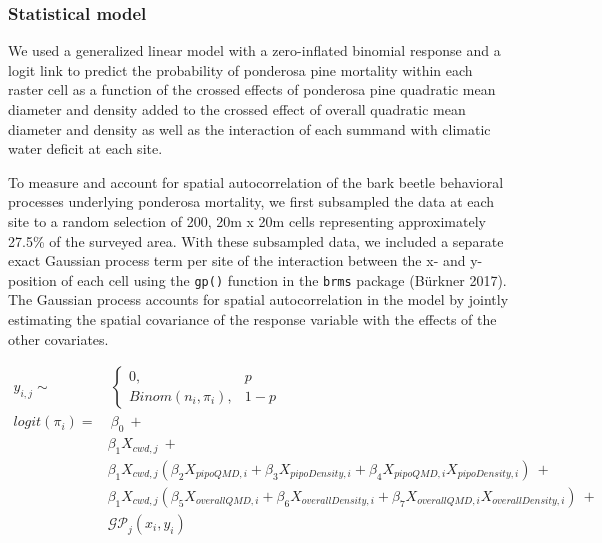 \documentclass[]{article}
\begin{document}
\subsubsection{Statistical model}\label{statistical-model}

We used a generalized linear model with a zero-inflated binomial
response and a logit link to predict the probability of ponderosa pine
mortality within each raster cell as a function of the crossed effects
of ponderosa pine quadratic mean diameter and density added to the
crossed effect of overall quadratic mean diameter and density as well as
the interaction of each summand with climatic water deficit at each
site.

To measure and account for spatial autocorrelation of the bark beetle
behavioral processes underlying ponderosa mortality, we first subsampled
the data at each site to a random selection of 200, 20m x 20m cells
representing approximately 27.5\% of the surveyed area. With these
subsampled data, we included a separate exact Gaussian process term per
site of the interaction between the x- and y-position of each cell using
the \texttt{gp()} function in the \texttt{brms} package (Bürkner 2017).
The Gaussian process accounts for spatial autocorrelation in the model
by jointly estimating the spatial covariance of the response variable
with the effects of the other covariates.

\[
\begin{aligned}
y_{i,j} \sim &\ \begin{cases}
0, & p \\
Binom(n_i, \pi_i), & 1-p
\end{cases} \\
logit(\pi_i) = &\ \beta_0\ + \\
& \beta_1X_{cwd, j}\ + \\
& \beta_1X_{cwd, j}(\beta_2X_{pipoQMD, i} + \beta_3X_{pipoDensity, i} + \beta_4X_{pipoQMD, i}X_{pipoDensity, i})\ + \\ 
& \beta_1X_{cwd, j}(\beta_5X_{overallQMD, i} + \beta_6X_{overallDensity, i} + \beta_7X_{overallQMD, i}X_{overallDensity, i})\ + \\
& \mathcal{GP}_j(x_i, y_i) \\
\end{aligned}
\]
\end{document}
